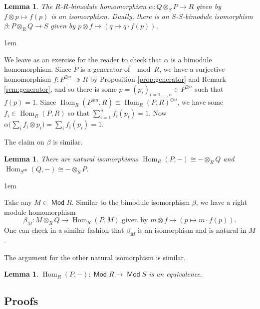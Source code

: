 \documentclass[11pt,a4paper]{article}
\makeatletter
\numberwithin{equation}{section}
\renewenvironment{proof}[1][\proofname]{\par
    \pushQED{\qed}%
    \normalfont \topsep0\p@\@plus6\p@ \labelsep1em\relax
    \trivlist
    \item[\hskip\labelsep\indent
        \bfseries #1]\ignorespaces
    \mbox{}
}{
    \popQED\endtrivlist\@endpefalse
}
\theoremstyle{all}
\newtheorem{lemma}[theorem]{Lemma}
\theoremstyle{remark}
\newcommand{\Hom}{\operatorname{Hom}\nolimits}
\newcommand{\op}{\mathrm{op}}
\DeclareMathOperator{\Mod}{\mathsf{Mod}}
\makeatother
\begin{document}
\begin{lemma}\label{lem:Morita bimod isom}
The $R$-$R$-bimodule homomorphism $\alpha: Q\otimes_S P\to R$ given by $f\otimes p\mapsto f(p)$ is an isomorphism.
Dually, there is an $S$-$S$-bimodule isomorphism $\beta: P\otimes_R Q \to S$ given by $p\otimes f\mapsto (q \mapsto q\cdot f(p))$.
\end{lemma}
\begin{proof}
We leave as an exercise for the reader to check that $\alpha$ is a bimodule homomorphism.
Since $P$ is a generator of $\mod R$, we have a surjective homomorphism $f:P^{\oplus n} \twoheadrightarrow R$ by Proposition \ref{prop:generator} and Remark \ref{rem:generator}, and so there is some $p=(p_i)_{i=1,\ldots, n}\in P^{\oplus n}$ such that $f(p)=1$.
Since $\Hom_R(P^{\oplus n}, R)\cong \Hom_R(P,R)^{\oplus n}$, we have some $f_i \in \Hom_R(P,R)$ so that $\sum_{i=1}^n f_i(p_i)=1$.
Now $\alpha\big ( \sum_i f_i\otimes p_i \big ) = \sum_{i} f_i(p_i) = 1$.

The claim on $\beta$ is similar.
\end{proof}


\begin{lemma}\label{lem:Hom-tensor swap Morita bimod}
There are natural isomorphisms $\Hom_R(P,-)\cong -\otimes_R Q$ and $\Hom_{S^\op}(Q,-)\cong -\otimes_S P$.
\end{lemma}
\begin{proof}
Take any $M\in \Mod R$.  Similar to the bimodule isomorphism $\beta$, we have a right module homomorphism
\[
\beta_M : M\otimes_R Q \to \Hom_R(P, M) \text{ given by } m\otimes f \mapsto ( p \mapsto m\cdot f(p) ).
\]
One can check in a similar fashion that $\beta_M$ is an isomorphism and is natural in $M$.

The argument for the other natural isomorphism is similar.
\end{proof}

\begin{lemma}
$\Hom_R(P,-):\Mod R\to \Mod S$ is an equivalence.
\end{lemma}


\subsection{Proofs}
\end{document}
